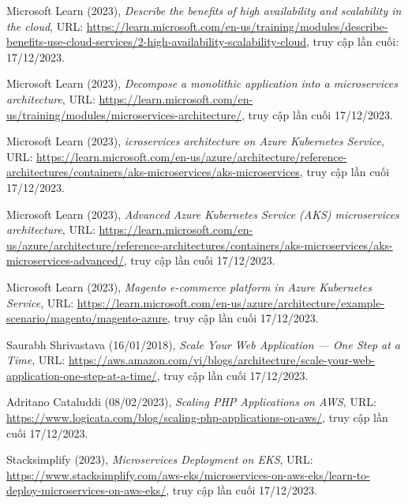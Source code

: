 \begin{thebibliography}{1}
Microsoft Learn (2023), \emph{Describe the benefits of high availability and scalability in the cloud}, URL: \url{https://learn.microsoft.com/en-us/training/modules/describe-benefits-use-cloud-services/2-high-availability-scalability-cloud}, truy cập lần cuối: 17/12/2023.

Microsoft Learn (2023), \emph{Decompose a monolithic application into a microservices architecture}, URL: \url{https://learn.microsoft.com/en-us/training/modules/microservices-architecture/}, truy cập lần cuối 17/12/2023.

Microsoft Learn (2023), \emph{icroservices architecture on Azure Kubernetes Service}, URL: \url{https://learn.microsoft.com/en-us/azure/architecture/reference-architectures/containers/aks-microservices/aks-microservices}, truy cập lần cuối 17/12/2023.

Microsoft Learn (2023), \emph{Advanced Azure Kubernetes Service (AKS) microservices architecture}, URL: \url{https://learn.microsoft.com/en-us/azure/architecture/reference-architectures/containers/aks-microservices/aks-microservices-advanced/}, truy cập lần cuối 17/12/2023.

Microsoft Learn (2023), \emph{Magento e-commerce platform in Azure Kubernetes Service}, URL: \url{https://learn.microsoft.com/en-us/azure/architecture/example-scenario/magento/magento-azure}, truy cập lần cuối 17/12/2023.

Saurabh Shrivastava (16/01/2018), \emph{Scale Your Web Application — One Step at a Time}, URL: \url{https://aws.amazon.com/vi/blogs/architecture/scale-your-web-application-one-step-at-a-time/}, truy cập lần cuối 17/12/2023.

Adritano Cataluddi (08/02/2023), \emph{Scaling PHP Applications on AWS}, URL: \url{https://www.logicata.com/blog/scaling-php-applications-on-aws/}, truy cập lần cuối 17/12/2023.

Stacksimplify (2023), \emph{Microservices Deployment on EKS}, URL: \url{https://www.stacksimplify.com/aws-eks/microservices-on-aws-eks/learn-to-deploy-microservices-on-aws-eks/}, truy cập lần cuối 17/12/2023.



\end{thebibliography}
